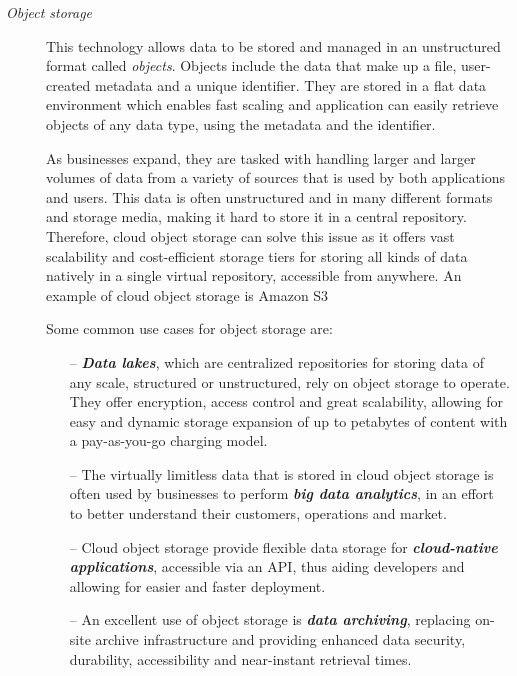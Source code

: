 \begin{description}
	\item[\textit{Object storage}] This technology allows data to be stored and managed in an unstructured format called \textit{objects}. Objects include the data that make up a file, user-created metadata and a unique identifier. They are stored in a flat data environment which enables fast scaling and application can easily retrieve objects of any data type, using the metadata and the identifier. 
	
	As businesses expand, they are tasked with handling larger and larger volumes of  data from a variety of sources that is used by both applications and users. This data is often unstructured and in many different formats and storage media, making it hard to store it in a central repository. Therefore, cloud object storage can solve this issue as it offers vast scalability and cost-efficient storage tiers for storing all kinds of data natively in a single virtual repository, accessible from anywhere. An example of cloud object storage is Amazon S3 \cite{s3}
	
	Some common use cases for object storage are:
	\begin{itemize} 
		\item[--] \textit{\textbf{Data lakes}}, which are centralized repositories for storing data of any scale, structured or unstructured, rely on object storage to operate.\cite{datalakes} They offer encryption, access control and great scalability, allowing for easy and dynamic storage expansion of up to petabytes of content with a pay-as-you-go charging model.
		
		\item[--]  The virtually limitless data that is stored in cloud object storage is often used by businesses to perform \textit{\textbf{big data analytics}}, in an effort to better understand their customers, operations and market.
		
		\item [--] Cloud object storage provide flexible data storage for \textit{\textbf{cloud-native applications}}, accessible via an API, thus aiding developers and allowing for easier and faster deployment.
		
		\item[--] An excellent use of object storage is \textbf{\textit{data archiving}}, replacing on-site archive infrastructure and providing enhanced data security, durability, accessibility and near-instant retrieval times. 
		

\end{itemize}
\end{description}
